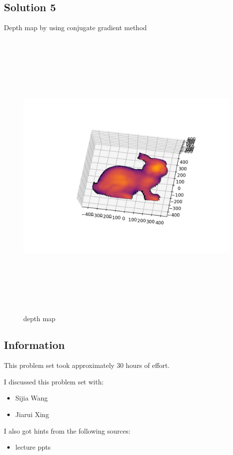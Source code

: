 \documentclass{article}
\newcommand{\info}{\clearpage \subsection*{Information}}
\newcommand{\solution}[1]{\clearpage \subsection*{Solution #1}}  %
\begin{document}
\solution{5}
Depth map by using conjugate gradient method
\begin{figure}[h!]
  \centering
  	\includegraphics[height=40em]{code/outputs/prob5.png}
	  \caption{depth map}
\end{figure}


\info

This problem set took approximately 30 hours of effort.


I discussed this problem set with:
\begin{itemize}
\item Sijia Wang
\item Jiarui Xing
\end{itemize}


I also got hints from the following sources:
\begin{itemize}
\item lecture ppts
\end{itemize}
\end{document}
